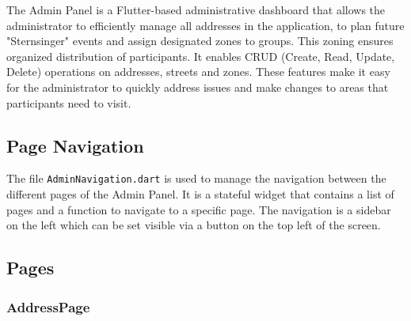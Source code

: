 The Admin Panel is a Flutter-based administrative dashboard that allows the administrator to efficiently manage all addresses in the application, to plan  future "Sternsinger" events and assign designated zones to groups. This zoning ensures organized distribution of participants. It enables CRUD (Create, Read, Update, Delete) operations on addresses, streets and zones. These features make it easy for the administrator to quickly address issues and make changes to areas that participants need to visit.

\subsection{Page Navigation}

The file \texttt{AdminNavigation.dart} is used to manage the navigation between the different pages of the Admin Panel. It is a stateful widget that contains a list of pages and a function to navigate to a specific page. The navigation is a sidebar on the left which can be set visible via a  button on the top left of the screen.





\subsection{Pages}

\subsubsection{AddressPage}

 